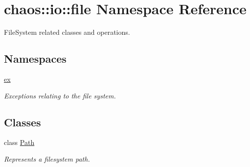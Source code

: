 \hypertarget{namespacechaos_1_1io_1_1file}{\section{chaos\-:\-:io\-:\-:file Namespace Reference}
\label{namespacechaos_1_1io_1_1file}
}


File\-System related classes and operations.  


\subsection*{Namespaces}
\begin{DoxyCompactItemize}
\item 
\hyperlink{namespacechaos_1_1io_1_1file_1_1ex}{ex}
\begin{DoxyCompactList}\small\item\em Exceptions relating to the file system. \end{DoxyCompactList}\end{DoxyCompactItemize}
\subsection*{Classes}
\begin{DoxyCompactItemize}
\item 
class \hyperlink{classchaos_1_1io_1_1file_1_1_path}{Path}
\begin{DoxyCompactList}\small\item\em Represents a filesystem path. \end{DoxyCompactList}\end{DoxyCompactItemize}

